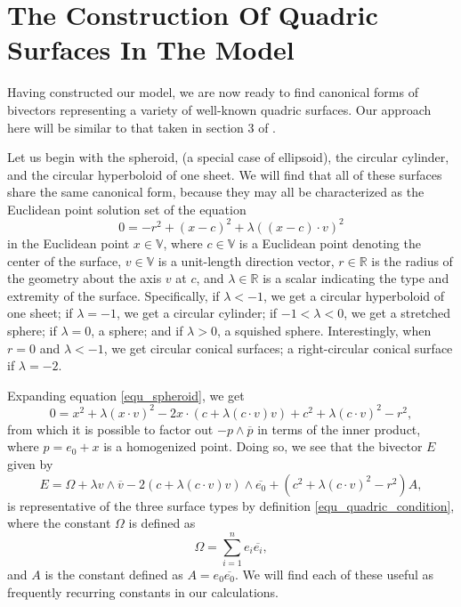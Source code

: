 \documentclass{birkjour}
\theoremstyle{definition}
\theoremstyle{remark}
\numberwithin{equation}{section}
\newcommand{\V}{\mathbb{V}}
\newcommand{\R}{\mathbb{R}}
\begin{document}
\section{The Construction Of Quadric Surfaces In The Model}

Having constructed our model, we are now ready to find canonical forms of bivectors
representing a variety of well-known quadric surfaces.  Our approach here will be
similar to that taken in section 3 of \cite{Miller87}.

Let us begin with the
spheroid, (a special case of ellipsoid), the circular cylinder, and the circular hyperboloid
of one sheet.  We will find that all of these surfaces share the same canonical form,
because they may all be characterized as the Euclidean point solution set of the equation
\begin{equation}\label{equ_spheroid}
0 = -r^2 + (x-c)^2 + \lambda((x-c)\cdot v)^2
\end{equation}
in the Euclidean point $x\in\V$, where $c\in\V$ is a Euclidean
point denoting the center of the surface, $v\in\V$ is a unit-length direction
vector, $r\in\R$ is the radius of the geometry about the axis $v$ at $c$, and
$\lambda\in\R$ is a scalar indicating the type and extremity of the surface.
Specifically, if $\lambda<-1$, we get a circular hyperboloid of one sheet;
if $\lambda=-1$, we get a circular cylinder; if $-1<\lambda<0$, we get a stretched
sphere; if $\lambda=0$, a sphere; and if $\lambda>0$, a squished sphere.  Interestingly,
when $r=0$ and $\lambda<-1$, we get circular conical surfaces; a right-circular conical
surface if $\lambda=-2$.

Expanding equation \eqref{equ_spheroid}, we get
\begin{equation}
0 = x^2 + \lambda(x\cdot v)^2 - 2x\cdot (c+\lambda(c\cdot v)v) + c^2 + \lambda(c\cdot v)^2 - r^2,
\end{equation}
from which it is possible to factor out $-p\wedge\overline{p}$
in terms of the inner product, where $p=e_0+x$
is a homogenized point.  Doing so, we see that the bivector
$E$ given by
\begin{equation}\label{equ_spheroid_bivector}
E = \Omega + \lambda v\wedge\overline{v} - 2(c+\lambda(c\cdot v)v)\wedge\overline{e_0} + (c^2+\lambda(c\cdot v)^2-r^2)A,
\end{equation}
is representative of the three surface types by definition \eqref{equ_quadric_condition}, where the constant
$\Omega$ is defined as
\begin{equation}
\Omega=\sum_{i=1}^n e_i\overline{e_i},
\end{equation}
and $A$ is the constant defined as $A=e_0\overline{e_0}$.  We will find each of these useful as
frequently recurring constants in our calculations.
\end{document}
